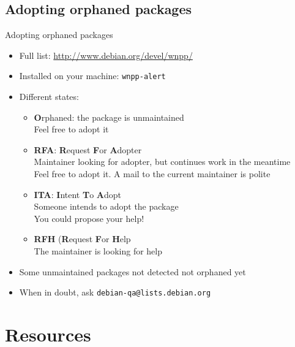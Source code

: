\documentclass[10pt,final]{beamer}
\begin{document}
\subsection{Adopting orphaned packages}
\begin{frame}{Adopting orphaned packages}
\begin{itemize}
	\item Full list: \url{http://www.debian.org/devel/wnpp/}
		\hbr
	\item Installed on your machine: \texttt{wnpp-alert}
		\hbr
	\item Different states:
	\begin{itemize}
		\item \textbf{O}rphaned: the package is unmaintained\\
			Feel free to adopt it
		\item \textbf{RFA}: \textbf{R}equest \textbf{F}or \textbf{A}dopter\\
			Maintainer looking for adopter, but continues work in the meantime\\
			Feel free to adopt it. A mail to the current maintainer is polite
		\item \textbf{ITA}: \textbf{I}ntent \textbf{T}o \textbf{A}dopt\\
			Someone intends to adopt the package\\
			You could propose your help!
		\item \textbf{RFH} (\textbf{R}equest \textbf{F}or \textbf{H}elp\\
			The maintainer is looking for help
	\end{itemize}
		\hbr
	\item Some unmaintained packages not detected \arr not orphaned yet
		\hbr
	\item When in doubt, ask \texttt{debian-qa@lists.debian.org}
	\end{itemize}
\end{frame}

\section{Resources}
\end{document}
